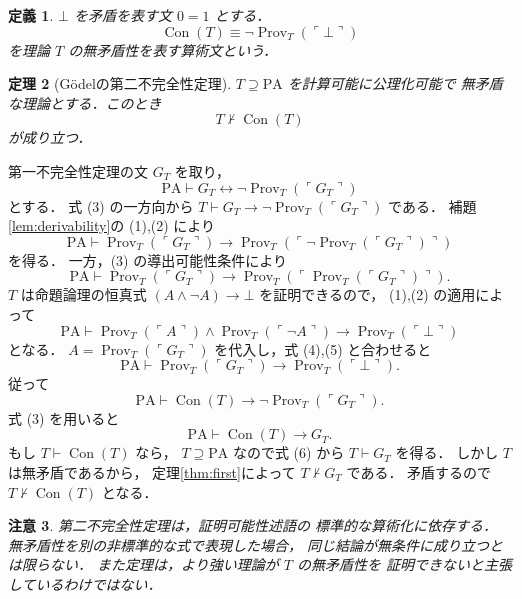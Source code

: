 \documentclass[a5paper,10pt,onecolumn]{jsarticle}
\makeatletter
\theoremstyle{mathnotetheorem}
\newtheorem{theorem}{定理}[section]
\newtheorem{definition}[theorem]{定義}
\newtheorem{remark}[theorem]{注意}
\renewcommand{\proofname}{証明}
\renewenvironment{proof}[1][\proofname]{%
  \par\pushQED{\qed}\normalfont\topsep4\p@\@plus2\p@\relax
  \trivlist\item[\hskip\labelsep\bfseries #1]\ignorespaces
}{\popQED\endtrivlist\@endpefalse}
\makeatother
\begin{document}
\begin{definition}
$\bot$ を矛盾を表す文 $0=1$ とする．
\[
 \operatorname{Con}(T)\equiv
 \neg\operatorname{Prov}_T(\ulcorner\bot\urcorner)
\]
を理論 $T$ の無矛盾性を表す算術文という．
\end{definition}

\begin{theorem}[Gödelの第二不完全性定理]
\label{thm:second}
$T\supseteq\mathrm{PA}$ を計算可能に公理化可能で
無矛盾な理論とする．このとき
\[
 T\not\vdash\operatorname{Con}(T)
\]
が成り立つ．
\end{theorem}
\begin{proof}
第一不完全性定理の文 $G_T$ を取り，
\[
 \mathrm{PA}\vdash
 G_T\leftrightarrow
 \neg\operatorname{Prov}_T(\ulcorner G_T\urcorner)
 \tag{3}
\]
とする．
式 (3) の一方向から
$T\vdash G_T\to
 \neg\operatorname{Prov}_T(\ulcorner G_T\urcorner)$
である．
補題\ref{lem:derivability}の (1),(2) により
\[
 \mathrm{PA}\vdash
 \operatorname{Prov}_T(\ulcorner G_T\urcorner)
 \to\operatorname{Prov}_T(
 \ulcorner\neg\operatorname{Prov}_T(
 \ulcorner G_T\urcorner)\urcorner)
 \tag{4}
\]
を得る．
一方，(3) の導出可能性条件により
\[
 \mathrm{PA}\vdash
 \operatorname{Prov}_T(\ulcorner G_T\urcorner)
 \to\operatorname{Prov}_T(
 \ulcorner\operatorname{Prov}_T(
 \ulcorner G_T\urcorner)\urcorner).
 \tag{5}
\]
$T$ は命題論理の恒真式
$(A\land\neg A)\to\bot$ を証明できるので，
(1),(2) の適用によって
\[
 \mathrm{PA}\vdash
 \operatorname{Prov}_T(\ulcorner A\urcorner)
 \land\operatorname{Prov}_T(\ulcorner\neg A\urcorner)
 \to\operatorname{Prov}_T(\ulcorner\bot\urcorner)
\]
となる．
$A=\operatorname{Prov}_T(\ulcorner G_T\urcorner)$
を代入し，式 (4),(5) と合わせると
\[
 \mathrm{PA}\vdash
 \operatorname{Prov}_T(\ulcorner G_T\urcorner)
 \to\operatorname{Prov}_T(\ulcorner\bot\urcorner).
\]
従って
\[
 \mathrm{PA}\vdash
 \operatorname{Con}(T)\to
 \neg\operatorname{Prov}_T(\ulcorner G_T\urcorner).
\]
式 (3) を用いると
\[
 \mathrm{PA}\vdash\operatorname{Con}(T)\to G_T.
 \tag{6}
\]
もし $T\vdash\operatorname{Con}(T)$ なら，
$T\supseteq\mathrm{PA}$ なので式 (6) から
$T\vdash G_T$ を得る．
しかし $T$ は無矛盾であるから，
定理\ref{thm:first}によって $T\not\vdash G_T$ である．
矛盾するので
$T\not\vdash\operatorname{Con}(T)$ となる．
\end{proof}

\begin{remark}
第二不完全性定理は，証明可能性述語の
\emph{標準的な算術化}に依存する．
無矛盾性を別の非標準的な式で表現した場合，
同じ結論が無条件に成り立つとは限らない．
また定理は，より強い理論が $T$ の無矛盾性を
証明できないと主張しているわけではない．
\end{remark}
\end{document}
